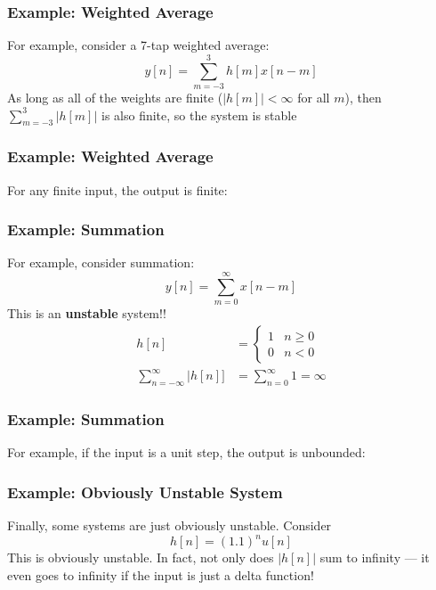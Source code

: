 \documentclass{beamer}
\begin{document}
\begin{frame}
  \frametitle{Example: Weighted Average}

  For example, consider a 7-tap weighted average:
  \begin{displaymath}
    y[n] = \sum_{m=-3}^3 h[m] x[n-m]
  \end{displaymath}
  As long as all of the weights are finite ($|h[m]|<\infty$ for all
  $m$), then $\sum_{m=-3}^3 |h[m]|$ is also finite, so the system is
  stable
\end{frame}

\begin{frame}
  \frametitle{Example: Weighted Average}

  For any finite input, the output is finite:
  \centerline{}
\end{frame}

\begin{frame}
  \frametitle{Example: Summation}

  For example, consider summation:
  \begin{displaymath}
    y[n] = \sum_{m=0}^\infty x[n-m]
  \end{displaymath}
  This is an {\bf unstable} system!!
  \begin{align*}
    h[n] &= \left\{\begin{array}{ll}1 & n\ge 0\\0 & n<0\end{array}\right.\\
    \sum_{n=-\infty}^\infty |h[n]] &=\sum_{n=0}^\infty 1 = \infty
  \end{align*}
\end{frame}

\begin{frame}
  \frametitle{Example: Summation}

  For example, if the input is a unit step, the output is unbounded:
  \centerline{}
\end{frame}

\begin{frame}
  \frametitle{Example: Obviously Unstable System}

  Finally, some systems are just obviously unstable.  Consider
  \begin{displaymath}
    h[n] = (1.1)^n u[n]
  \end{displaymath}
  This is obviously unstable.  In fact, not only does $|h[n]|$ sum to
  infinity --- it even goes to infinity if the input is just a delta function!
\end{frame}
\end{document}

